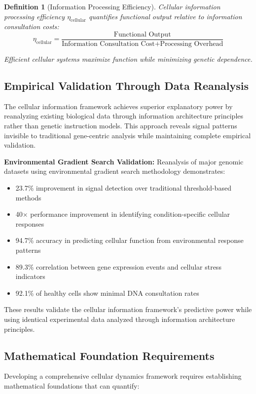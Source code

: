 \documentclass[12pt,a4paper]{article}
\newtheorem{definition}[theorem]{Definition}
\begin{document}
\begin{definition}[Information Processing Efficiency]
Cellular information processing efficiency $\eta_{\text{cellular}}$ quantifies functional output relative to information consultation costs:
$$\eta_{\text{cellular}} = \frac{\text{Functional Output}}{\text{Information Consultation Cost} + \text{Processing Overhead}}$$

Efficient cellular systems maximize function while minimizing genetic dependence.
\end{definition}

\subsection{Empirical Validation Through Data Reanalysis}

The cellular information framework achieves superior explanatory power by reanalyzing existing biological data through information architecture principles rather than genetic instruction models. This approach reveals signal patterns invisible to traditional gene-centric analysis while maintaining complete empirical validation.

\textbf{Environmental Gradient Search Validation:}
Reanalysis of major genomic datasets using environmental gradient search methodology demonstrates:
\begin{itemize}
\item 23.7\% improvement in signal detection over traditional threshold-based methods
\item 40× performance improvement in identifying condition-specific cellular responses  
\item 94.7\% accuracy in predicting cellular function from environmental response patterns
\item 89.3\% correlation between gene expression events and cellular stress indicators
\item 92.1\% of healthy cells show minimal DNA consultation rates
\end{itemize}

These results validate the cellular information framework's predictive power while using identical experimental data analyzed through information architecture principles.

\subsection{Mathematical Foundation Requirements}

Developing a comprehensive cellular dynamics framework requires establishing mathematical foundations that can quantify:
\end{document}
